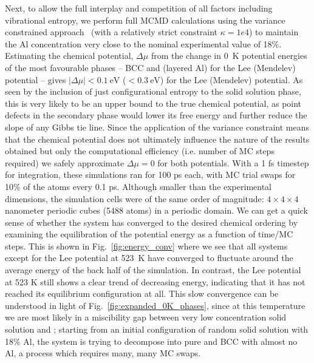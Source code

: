 Next, to allow the full interplay and competition of all factors including vibrational entropy, we perform full MCMD calculations using the variance constrained approach~\cite{sadigh2012calculation, sadigh2012scalable} (with a relatively strict constraint $\kappa = 1e4$) to maintain the Al concentration very close to the nominal experimental value of 18\%.
Estimating the chemical potential, $\Delta \mu$ from the change in 0~K potential energies of the most favourable phases -- BCC and \DOTHREE (layered Al) for the Lee (Mendelev) potential -- gives $|\Delta \mu| < 0.1~\mathrm{eV}$ ($<0.3~\mathrm{eV}$) for the Lee (Mendelev) potential.
As seen by the inclusion of just configurational entropy to the solid solution phase, this is very likely to be an upper bound to the true chemical potential, as point defects in the secondary phase would lower its free energy and further reduce the slope of any Gibbs tie line.
Since the application of the variance constraint means that the chemical potential does not ultimately influence the nature of the results obtained but only the computational efficiency (i.e. number of MC steps required) we safely approximate $\Delta \mu = 0 $ for both potentials.
With a 1 fs timestep for integration, these simulations ran for 100 ps each, with MC trial swaps for 10\% of the atoms every 0.1 ps.
Although smaller than the experimental dimensions, the simulation cells were of the same order of magnitude: $4\times4\times4$ nanometer periodic cubes (5488 atoms) in a periodic domain.
We can get a quick sense of whether the system has converged to the desired chemical ordering by examining the equilibration of the potential energy as a function of time/MC steps.
This is shown in Fig.~\ref{fig:energy_conv} where we see that all systems except for the Lee potential at 523~K have converged to fluctuate around the average energy of the back half of the simulation.
In contrast, the Lee potential at 523 K still shows a clear trend of decreasing energy, indicating that it has not reached its equilibrium configuration at all.
This slow convergence can be understood in light of Fig.~\ref{fig:expanded_0K_phases}, since at this temperature we are most likely in a miscibility gap between very low concentration solid solution and \DOTHREE;
starting from an initial configuration of random solid solution with 18\% Al, the system is trying to decompose into pure \DOTHREE and BCC with almost no Al, a process which requires many, many MC swaps.
%

